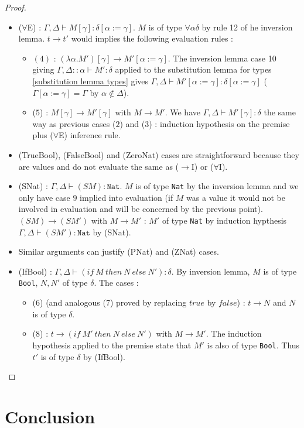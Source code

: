 \documentclass{article}
\begin{document}
\begin{proof}
\begin{itemize}
            \item ($\forall$E) : $\Gamma,\Delta\vdash M [\gamma] : \delta[\alpha:=\gamma]$. $M$ is of type $\forall \alpha \delta$ by rule 12 of he inversion lemma. $t\rightarrow t'$ would implies the following evaluation rules :
            \begin{itemize}
                \item $(4)$ : $(\lambda \alpha.M') [\gamma]\rightarrow M'[\alpha:=\gamma]$. The inversion lemma case 10 giving $\Gamma, \Delta::\alpha\vdash M' : \delta$ applied to the substitution lemma for types \ref{substitution lemma types} gives $\Gamma,\Delta\vdash M'[\alpha:=\gamma] : \delta[\alpha:=\gamma]$ ($\Gamma[\alpha:=\gamma] = \Gamma$ by $\alpha\not\in\Delta$).

                \item ($5$) : $M[\gamma] \rightarrow M'[\gamma]$ with $M \rightarrow M'$. We have $\Gamma,\Delta\vdash M'[\gamma] : \delta$ the same way as previous cases ($2$) and ($3$) : induction hypothesis on the premise plus ($\forall$E) inference rule.
            \end{itemize}

            \item (TrueBool), (FalseBool) and (ZeroNat) cases are straightforward because they are values and do not evaluate the same as ($\rightarrow$I) or ($\forall$I).

            \item (SNat) : $\Gamma,\Delta\vdash (S M) : \texttt{Nat}$. $M$ is of type \texttt{Nat} by the inversion lemma and we only have case $9$ implied into evaluation (if $M$ was a value it would not be involved in evaluation and will be concerned by the previous point).  $(S M)\rightarrow (S M') $ with $M \rightarrow M'$ : $M'$ of type \texttt{Nat} by induction hypthesis $\Gamma,\Delta\vdash (S M') : \texttt{Nat}$ by (SNat).

            \item Similar arguments can justify (PNat) and (ZNat) cases.

            \item (IfBool) : $\Gamma,\Delta\vdash (if \ M \ then \ N \ else \ N') : \delta$. By inversion lemma, $M$ is of type \texttt{Bool}, $N,N'$ of type $\delta$. The cases :
            \begin{itemize}
                \item (6) (and analogous (7) proved by replacing $true$ by $false$) : $t \rightarrow N$ and $N$ is of type $\delta$.
                
                \item (8) : $t \rightarrow (if \ M' \ then \ N \ else \ N')$ with $M\rightarrow M'$. The induction hypothesis applied to the premise state that $M'$ is also of type \texttt{Bool}. Thus $t'$ is of type $\delta$ by (IfBool).
            \end{itemize}
        \end{itemize}
    \end{proof}

\section{Conclusion}


\nocite{*} 
\printbibliography
\end{document}
